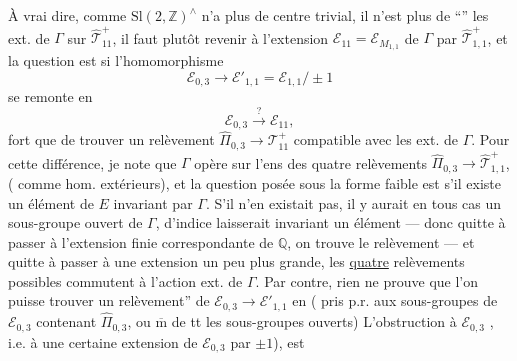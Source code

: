 À vrai dire, comme $\mathrm{Sl}(2,\mathbb Z)^{\wedge}$ n'a plus de centre trivial, il n'est plus   de  ``''  les  ext. de $\Gamma$ sur $\widehat{\mathcal T}_{11}^{+}$, il faut plutôt revenir à l'extension $\mathcal E_{11}=\mathcal E_{M_{1,1}}$ de $\Gamma$ par $\widehat{\mathcal T}_{1,1}^{+}$, et la question est si l'homomorphisme
\[
\mathcal E_{0,3}\longrightarrow\mathcal E'_{1,1}=\mathcal E_{1,1}/\pm1
\]
se remonte en
\[
\mathcal E_{0,3}\xrightarrow{?}\mathcal E_{11},
\]
 fort que de trouver un relèvement $\widehat{\Pi}_{0,3}\longrightarrow\mathcal T_{11}^{+}$ compatible avec les  ext. de $\Gamma$. Pour  cette différence, je note que $\Gamma$ opère sur l'ens des quatre relèvements  $\widehat{\Pi}_{0,3}\longrightarrow\widehat{\mathcal T}_{1,1}^{+}$, ( comme hom. extérieurs), et la
question posée sous la forme faible est s'il existe un élément de $E$ invariant par $\Gamma$. S'il n'en existait pas, il y aurait en tous cas un sous-groupe ouvert de $\Gamma$, d'indice    laisserait invariant un élément --- donc quitte à passer à l'extension  finie correspondante de $\mathbb Q$, on trouve le relèvement --- et quitte à passer à une extension un peu plus grande, les \uline{quatre} relèvements possibles commutent à l'action ext. de $\Gamma$. Par contre, rien ne prouve que l'on puisse trouver un  relèvement''  de $\mathcal E_{0,3}\longrightarrow\mathcal E'_{1,1}$ en  ( pris p.r. aux sous-groupes  de $\mathcal E_{0,3}$  contenant $\widehat\Pi_{0,3}$, ou $\overline{\mathrm m}$ de tt les sous-groupes ouverts) L'obstruction à  $\mathcal E_{0,3}$ , i.e. à \uline{} une certaine extension de $\mathcal E_{0,3}$ par  $\pm1$), est
